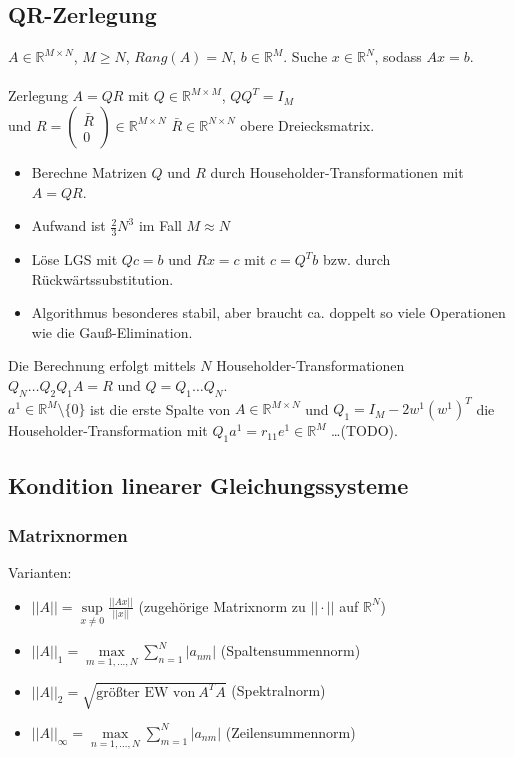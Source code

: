 \documentclass[a4paper]{article}
\newcommand{\set}[1]{\{ #1 \}}
\begin{document}
\subsection{QR-Zerlegung}

$ A \in \mathbb{R}^{M \times N} $, $M \ge N$, $Rang(A) = N$,
$b \in \mathbb{R}^M$.
Suche $ x \in \mathbb{R}^{N} $, sodass $Ax=b$.
\\
\\
Zerlegung $A = QR$ mit $Q \in \mathbb{R}^{M \times M}$, $QQ^T=I_M$
\\
\hspace{4em}
und $R = \begin{pmatrix}\bar{R}\\0\end{pmatrix} \in \mathbb{R}^{M \times N}$
$\bar{R} \in \mathbb{R}^{N \times N}$ obere Dreiecksmatrix. 

\begin{itemize}
    \item Berechne Matrizen $Q$ und $R$ durch
    Householder-Transformationen mit $A = QR$.
    \item Aufwand ist $\frac{2}{3} N^3$ im Fall $M \approx N$
    \item Löse LGS mit $Qc = b$ und $Rx = c$
    mit $c = Q^T b$ bzw. durch Rückwärtssubstitution.
    \item Algorithmus besonderes stabil, aber braucht ca. doppelt so viele
    Operationen wie die Gauß-Elimination.
\end{itemize}

Die Berechnung erfolgt mittels $N$ Householder-Transformationen
$Q_N \dots Q_2 Q_1A = R$ und $Q = Q_1 \dots Q_N$.
\\
$a^1 \in \mathbb{R}^M \setminus \set{0}$ ist die erste Spalte von
$A \in \mathbb{R}^{M \times N}$ und $Q_1 = I_M - 2w^1(w^1)^T$ die
Householder-Transformation mit $Q_1 a^1 = r_11 e^1 \in \mathbb{R}^M$
\dots (TODO).

\subsection{Kondition linearer Gleichungssysteme}

\subsubsection{Matrixnormen}

Varianten:
\begin{itemize}
    \item $||A|| = \sup\limits_{x \neq 0} \frac{||Ax||}{||x||}$
    (zugehörige Matrixnorm zu $||\cdot||$ auf $\mathbb{R}^N$)
    \item $||A||_1 = \max\limits_{m=1,...,N} \sum_{n=1}^N |a_{nm}|$
    (Spaltensummennorm)
    \item $||A||_2 = \sqrt{\textrm{größter EW von}~A^T A}$
    (Spektralnorm)
    \item $||A||_\infty = \max\limits_{n=1,...,N} \sum_{m=1}^N |a_{nm}|$
    (Zeilensummennorm)
\end{itemize}
\end{document}
